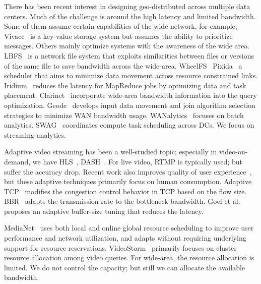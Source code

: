  There has been recent interest in designing
geo-distributed across multiple data centers. Much of the challenge is around
the high latency and limited bandwidth. Some of them assume certain capabilities
of the wide network, for example, Vivace~\cite{cho2012surviving} is a key-value
storage system but assumes the ability to prioritize messages. Others mainly
optimize systems with the awareness of the wide
area. LBFS~\cite{muthitacharoen2001low} is a network file system that exploits
similarities between files or versions of the same file to save bandwidth across
the wide-area. WheelFS~\cite{stribling2009flexible}
Pixida~\cite{kloudas2015pixida} a scheduler that aims to minimize data movement
across resource constrained links.  Iridium~\cite{pu2015low} reduces the latency
for MapReduce jobs by optimizing data and task
placement. Clarinet~\cite{viswanathan2016clarinet} incorporate wide-area
bandwidth information into the query
optimization. Geode~\cite{vulimiri2015global} develops input data movement and
join algorithm selection strategies to minimize WAN bandwidth
usage. WANalytics~\cite{vulimiri2015wananlytics} focuses on batch
analytics. SWAG~\cite{hung2015scheduling} coordinates compute task scheduling
across DCs. We focus on streaming analytics.


 Adaptive video streaming has been a
well-studied topic; especially in video-on-demand, we have
HLS~\cite{pantos2016http}, DASH~\cite{michalos2012dynamic}. For live video, RTMP
is typically used; but suffer the accuracy drop. Recent work also improves
quality of user experience~\cite{yin2015control}, but these adaptive techniques
primarily focus on human consumption. Adaptive TCP~\cite{wu2013adaptive}
modifies the congestion control behavior in TCP based on the flow
size. BBR~\cite{cardwell2017bbr} adapts the transmission rate to the bottleneck
bandwidth. Goel et al.~\cite{goel2008low} proposes an adaptive buffer-size
tuning that reduces the latency.

 MediaNet~\cite{hicks2003user} uses both local
and online global resource scheduling to improve user performance and network
utilization, and adapts without requiring underlying support for resource
reservations. VideoStorm~\cite{zhang2017live} primarily focuses on cluster
resource allocation among video queries. For wide-area, the resource allocation
is limited. We do not control the capacity; but still we can allocate the
available bandwidth.




